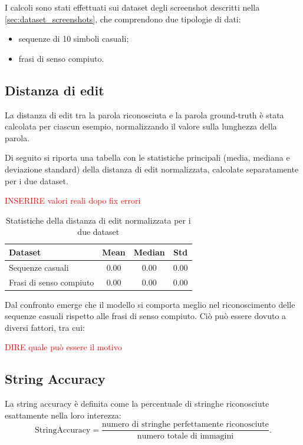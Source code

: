 I calcoli sono stati effettuati sui dataset degli screenshot descritti nella \autoref{sec:dataset_screenshots}, che comprendono due tipologie di dati:
\begin{itemize}
    \item sequenze di 10 simboli casuali;
    \item frasi di senso compiuto.
\end{itemize}

\subsection{Distanza di edit}

La distanza di edit tra la parola riconosciuta e la parola ground-truth è stata calcolata per ciascun esempio, normalizzando il valore sulla lunghezza della parola.

Di seguito si riporta una tabella con le statistiche principali (media, mediana e deviazione standard) della distanza di edit normalizzata, calcolate separatamente per i due dataset.

\textcolor{red}{INSERIRE valori reali dopo fix errori}

\begin{table}[htbp]
    \centering
    \begin{tabular}{lccc}
        \toprule
        Dataset & Mean & Median & Std \\
        \midrule
        Sequenze casuali & 0.00 & 0.00 & 0.00 \\
        Frasi di senso compiuto & 0.00 & 0.00 & 0.00 \\
        \bottomrule
    \end{tabular}
    \caption{Statistiche della distanza di edit normalizzata per i due dataset}
    \label{tab:edit_distance_stats}
\end{table}

Dal confronto emerge che il modello si comporta meglio nel riconoscimento delle sequenze casuali rispetto alle frasi di senso compiuto. Ciò può essere dovuto a diversi fattori, tra cui:

\textcolor{red}{DIRE quale può essere il motivo}

\subsection{String Accuracy}
La string accuracy è definita come la percentuale di stringhe riconosciute esattamente nella loro interezza:
\[
    \mathrm{StringAccuracy} = \frac{\text{numero di stringhe perfettamente riconosciute}}{\text{numero totale di immagini}}.
\]

